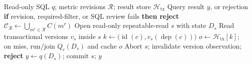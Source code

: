 \begin{algorithm}[t]
\caption{}
\label{alg:snapshot-execution}
\normalsize
\begin{algorithmic}[1]
\Require Read-only SQL $q$; metric revisions $\mathcal R$; result store $\mathcal H_{\mathrm{tx}}$
\Ensure Query result $y$, or rejection
\State \textbf{if} revision, required-filter, or SQL review fails \textbf{then reject}
\State $\mathcal C_{\mathcal R}\gets\bigcup_{m^r\in\mathcal R}C(m^r)$
\State Open read-only repeatable-read $s$ with state $D_s$
\State Read transactional versions $v_s$ inside $s$
  \State $k\gets\bigl(\operatorname{id}(c),v_s(\operatorname{dep}(c))\bigr)$
  \State $o\gets\mathcal H_{\mathrm{tx}}[k]$; on miss, run/join $Q_c(D_s)$ and cache $o$
    \State Abort $s$; invalidate version observation; \textbf{reject}
  \EndIf
\EndFor
\State $y\gets q(D_s)$; commit $s$; \Return $y$
\end{algorithmic}
\end{algorithm}
